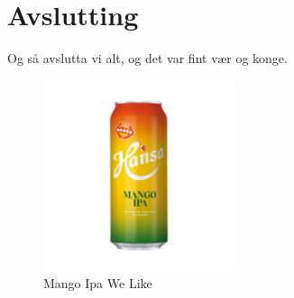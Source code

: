 \chapter{Avslutting}
\thispagestyle{fancy}
Og så avslutta vi alt, og det var fint vær og konge.

\begin{figure}[htbp]
    \centering
    \includegraphics[width=0.5\textwidth]{Bilder/mango.jpg}
    \caption{Mango Ipa We Like}
    \label{fig:Mango-Logo}
\end{figure}
    